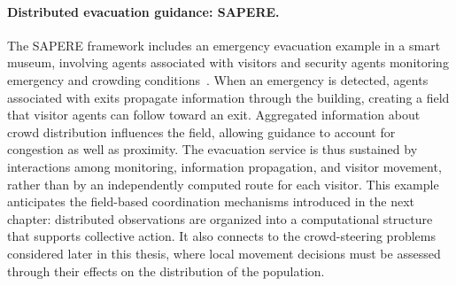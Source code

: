 \paragraph{Distributed evacuation guidance: SAPERE.}
The SAPERE framework includes an emergency evacuation example in a smart museum, 
 involving agents associated with visitors
 and security agents monitoring emergency and crowding conditions~\cite{DBLP:journals/taas/CastelliMRZ15}.
%
When an emergency is detected,
 agents associated with exits propagate information through the building,
 creating a field that visitor agents can follow toward an exit.
%
Aggregated information about crowd distribution influences the field,
 allowing guidance to account for congestion as well as proximity.
%
The evacuation service is thus sustained by interactions among monitoring, 
 information propagation, and visitor movement,
 rather than by an independently computed route for each visitor.
%
This example anticipates the field-based coordination mechanisms
 introduced in the next chapter:
 distributed observations are organized into a computational structure
 that supports collective action.
%
It also connects to the crowd-steering problems considered later in this thesis, 
 where local movement decisions must be assessed through their effects on the distribution of the population.
